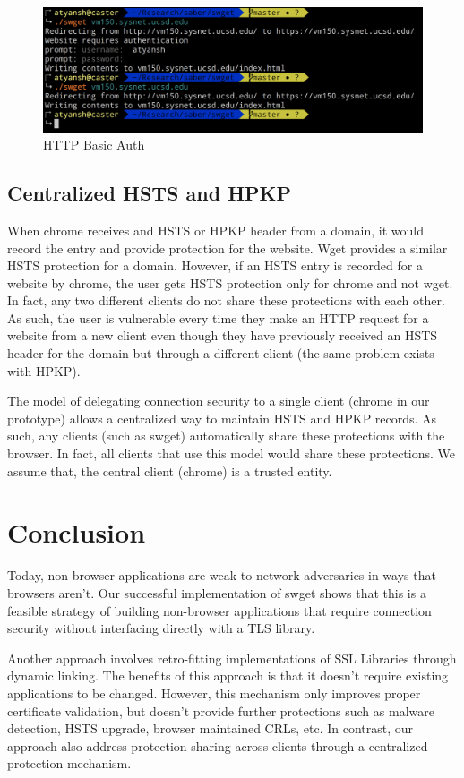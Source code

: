 \begin{figure}[h]
  \includegraphics[width=\textwidth]{figures/basic-auth}
  \caption{HTTP Basic Auth} 
  \label{fig:basic-auth-saber}
\end{figure}

\subsection{Centralized HSTS and HPKP}
When chrome receives and HSTS or HPKP header from a domain, it would record the
entry and provide protection for the website. Wget provides a similar HSTS
protection for a domain. However, if an HSTS entry is recorded for a website by
chrome, the user gets HSTS protection only for chrome and not wget. In fact,
any two different clients do not share these protections with each other. As
such, the user is vulnerable every time they make an HTTP request for a website
from a new client even though they have previously received an HSTS header for
the domain but through a different client (the same problem exists with HPKP).

The model of delegating connection security to a single client (chrome in our
prototype) allows a centralized way to maintain HSTS and HPKP records. As such,
any clients (such as swget) automatically share these protections with the
browser. In fact, all clients that use this model would share these
protections. We assume that, the central client (chrome) is a trusted entity.

\section{Conclusion}
\label{sec:conclusion-saber}

Today, non-browser applications are weak to network adversaries in ways that
browsers aren't. Our successful implementation of swget shows that this is a
feasible strategy of building non-browser applications that require connection
security without interfacing directly with a TLS library.

Another approach involves retro-fitting implementations of SSL Libraries
through dynamic linking\cite{certshim}. The benefits of this approach is that
it doesn't require existing applications to be changed. However, this mechanism
only improves proper certificate validation, but doesn't provide further
protections such as malware detection, HSTS upgrade, browser maintained CRLs,
etc. In contrast, our approach also address protection sharing across clients
through a centralized protection mechanism.

